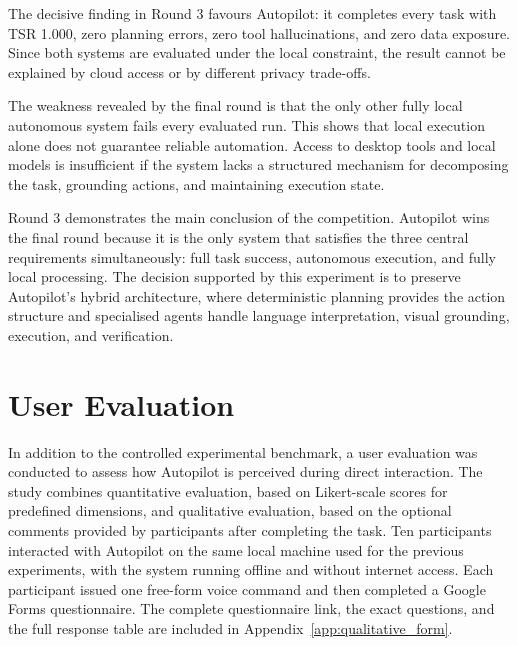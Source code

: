The decisive finding in Round 3 favours Autopilot: it completes every task with TSR 1.000, zero planning errors, zero tool hallucinations, and zero data exposure. Since both systems are evaluated under the local constraint, the result cannot be explained by cloud access or by different privacy trade-offs.

The weakness revealed by the final round is that the only other fully local autonomous system fails every evaluated run. This shows that local execution alone does not guarantee reliable automation. Access to desktop tools and local models is insufficient if the system lacks a structured mechanism for decomposing the task, grounding actions, and maintaining execution state.

Round 3 demonstrates the main conclusion of the competition. Autopilot wins the final round because it is the only system that satisfies the three central requirements simultaneously: full task success, autonomous execution, and fully local processing. The decision supported by this experiment is to preserve Autopilot's hybrid architecture, where deterministic planning provides the action structure and specialised agents handle language interpretation, visual grounding, execution, and verification.

\section{User Evaluation}

In addition to the controlled experimental benchmark, a user evaluation was conducted to assess how Autopilot is perceived during direct interaction. The study combines quantitative evaluation, based on Likert-scale scores for predefined dimensions, and qualitative evaluation, based on the optional comments provided by participants after completing the task. Ten participants interacted with Autopilot on the same local machine used for the previous experiments, with the system running offline and without internet access. Each participant issued one free-form voice command and then completed a Google Forms questionnaire. The complete questionnaire link, the exact questions, and the full response table are included in Appendix~\ref{app:qualitative_form}.

